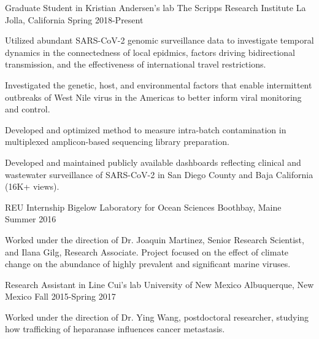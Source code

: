 
\begin{cventries}

  \cventry
    {Graduate Student in Kristian Andersen's lab} %
    {The Scripps Research Institute} %
    {La Jolla, California} %
    {Spring 2018-Present} %
    {
      \begin{cvitems} %
        \item {Utilized abundant SARS-CoV-2 genomic surveillance data to investigate temporal dynamics in the connectedness of local epidmics, factors driving bidirectional transmission, and the effectiveness of international travel restrictions.}
        \item {Investigated the genetic, host, and environmental factors that enable intermittent outbreaks of West Nile virus in the Americas to better inform viral monitoring and control.}
        \item {Developed and optimized method to measure intra-batch contamination in multiplexed amplicon-based sequencing library preparation.}
        \item {Developed and maintained publicly available dashboards reflecting clinical and wastewater surveillance of SARS-CoV-2 in San Diego County and Baja California (16K+ views).}
      \end{cvitems}
    }

  \cventry
    {REU Internship} %
    {Bigelow Laboratory for Ocean Sciences} %
    {Boothbay, Maine} %
    {Summer 2016} %
    {
      \begin{cvitems}
        \item{
          Worked under the direction of Dr. Joaquin Martinez, Senior Research Scientist, and Ilana Gilg, Research Associate.
          Project focused on the effect of climate change on the abundance of highly prevalent and significant marine viruses.
        }
      \end{cvitems}
    }

  \cventry
    {Research Assistant in Line Cui's lab} %
    {University of New Mexico} %
    {Albuquerque, New Mexico} %
    {Fall 2015-Spring 2017} %
    {
      \begin{cvitems}
        \item{Worked under the direction of Dr. Ying Wang, postdoctoral researcher, studying how trafficking of heparanase influences cancer metastasis.}
      \end{cvitems}
    }

\end{cventries}
